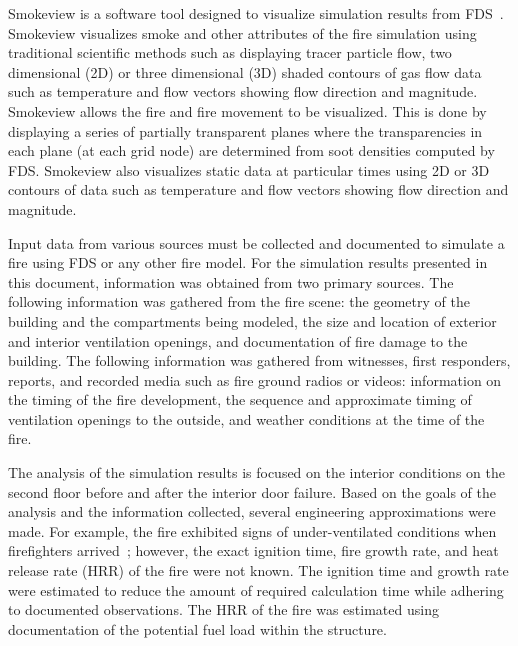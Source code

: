 \documentclass[12pt,oneside]{book}
\begin{document}
Smokeview is a software tool designed to visualize simulation results from FDS~\cite{Smokeview_Users_Guide}. Smokeview visualizes smoke and other attributes of the fire simulation using traditional scientific methods such as displaying tracer particle flow, two dimensional (2D) or three dimensional (3D) shaded contours of gas flow data such as temperature and flow vectors showing flow direction and magnitude. Smokeview allows the fire and fire movement to be visualized. This is done by displaying a series of partially transparent planes where the transparencies in each plane (at each grid node) are determined from soot densities computed by FDS. Smokeview also visualizes static data at particular times using 2D or 3D contours of data such as temperature and flow vectors showing flow direction and magnitude.

Input data from various sources must be collected and documented to simulate a fire using FDS or any other fire model. For the simulation results presented in this document, information was obtained from two primary sources. The following information was gathered from the fire scene: the geometry of the building and the compartments being modeled, the size and location of exterior and interior ventilation openings, and documentation of fire damage to the building. The following information was gathered from witnesses, first responders, reports, and recorded media such as fire ground radios or videos: information on the timing of the fire development, the sequence and approximate timing of ventilation openings to the outside, and weather conditions at the time of the fire. 

The analysis of the simulation results is focused on the interior conditions on the second floor before and after the interior door failure. Based on the goals of the analysis and the information collected, several engineering approximations were made. For example, the fire exhibited signs of under-ventilated conditions when firefighters arrived~\cite{NIOSH:Bowyer}; however, the exact ignition time, fire growth rate, and heat release rate (HRR) of the fire were not known. The ignition time and growth rate were estimated to reduce the amount of required calculation time while adhering to documented observations. The HRR of the fire was estimated using documentation of the potential fuel load within the structure.
\end{document}
